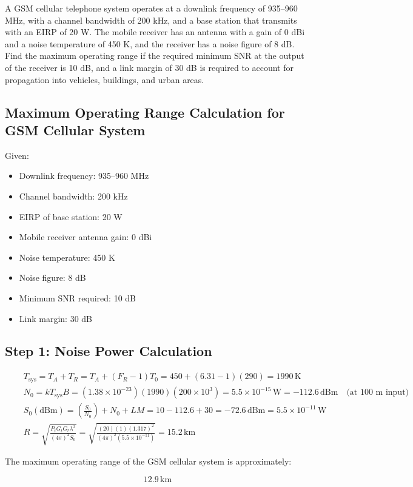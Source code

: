 \documentclass[cn,12pt]{homework}
\begin{document}
 A GSM cellular telephone system operates at a downlink frequency of 935–960 MHz, with a channel
bandwidth of 200 kHz, and a base station that transmits with an EIRP of 20 W. The mobile receiver
has an antenna with a gain of 0 dBi and a noise temperature of 450 K, and the receiver has a noise
figure of 8 dB. Find the maximum operating range if the required minimum SNR at the output of the
receiver is 10 dB, and a link margin of 30 dB is required to account for propagation into vehicles,
buildings, and urban areas.

\begin{solution}
  \section*{Maximum Operating Range Calculation for GSM Cellular System}

Given:
\begin{itemize}
  \item Downlink frequency: 935--960 MHz
  \item Channel bandwidth: 200 kHz
  \item EIRP of base station: 20 W
  \item Mobile receiver antenna gain: 0 dBi
  \item Noise temperature: 450 K
  \item Noise figure: 8 dB
  \item Minimum SNR required: 10 dB
  \item Link margin: 30 dB
\end{itemize}

\subsection*{Step 1: Noise Power Calculation}

\begin{align*}
 & \quad T_{\text{sys}} = T_A + T_R = T_A + (F_R - 1)T_0 = 450 + (6.31 - 1)(290) = 1990 \, \text{K} \\
 & \quad N_0 = kT_{\text{sys}}B = (1.38 \times 10^{-23})(1990)(200 \times 10^3) = 5.5 \times 10^{-15} \, \text{W} = -112.6 \, \text{dBm} \quad \text{(at 100 m input)} \\
 & \quad S_0(\text{dBm}) = \left(\frac{S_0}{N_0}\right) + N_0 + LM = 10 - 112.6 + 30 = -72.6 \, \text{dBm} = 5.5 \times 10^{-11} \, \text{W} \\
 & \quad R = \sqrt{\frac{P_t G_t G_r \lambda^2}{(4\pi)^2 S_0}} = \sqrt{\frac{(20)(1)(1.317)^2}{(4\pi)^2(5.5 \times 10^{-11})}} = 15.2 \, \text{km}
\end{align*}

The maximum operating range of the GSM cellular system is approximately:

\[
\boxed{12.9 \, \text{km}}
\]
\end{solution}
\newpage
\end{document}
